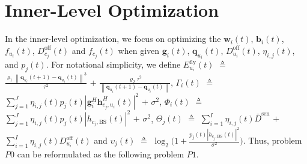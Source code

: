 \documentclass[10pt,journal,compsoc]{IEEEtran}
\begin{document}
\section{Inner-Level Optimization}\label{sec:inner-level-optimization}
In the inner-level optimization, we focus on optimizing the $\bm{w}_{i}(t)$, $\bm{b}_{i}(t)$, $f_{u_{i}}(t)$, $D_{c_{j}}^{\text{off}}(t)$ and $f_{c_{j}}(t)$ when given $\bm{g}_{i}(t)$, $\bm{q}_{u_{i}}(t)$, $D_{u_{i}}^{\text{off}} (t)$, $\eta_{i, j}(t)$, and $p_{j}(t)$.
For notational simplicity, we define
$E_{u_i}^{\text{fly}}(t)$ $\triangleq$ $\frac{\varrho_1\left\|\bm{q}_{u_i}(t+1)-\bm{q}_{u_i}(t)\right\|^3}{\tau^2}$ $+$ $\frac{\varrho_2\tau^2}{\left\|\bm{q}_{u_i}(t+1)-\bm{q}_{u_i}(t)\right\|}$,
$\Gamma_{i}(t)$ $\triangleq$ $\sum_{j = 1 }^{J} \eta_{i, j}(t) p_{j}(t) \left|\bm{g}_{i}^{H}\bm{h}_{c_{j}, u_{i}}^{H}(t)\right|^{2}$ $+$ $\sigma^{2}$,
$\Phi_i(t)$ $\triangleq$ $\sum_{j=1}^{J}\eta_{i,j}(t)p_{j}(t)\left|h_{c_{j},\text{BS}}(t)\right|^{2}$ $+$ $\sigma^{2}$,
$\Theta_j(t)$ $\triangleq$ $\sum_{i = 1}^{I} \eta_{i, j}(t) \bar{D}^{\text{sen}}$ $+$ $\sum_{i = 1}^{I} \eta_{i, j}(t) D_{u_{i}}^{\text{off}}(t)$ and
$\upsilon_j(t)$ $\triangleq$ $\log_2 \big( 1 + \frac{p_{j}(t) \left|h_{c_{j}, \text{BS}}(t)\right|^{2}}{\sigma^{2}} \big)$.
Thus, problem $P0$ can be reformulated as the following problem $P1$.
\end{document}

